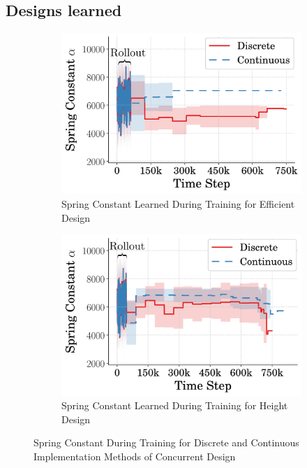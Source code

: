 \subsection{Designs learned}
%  
\begin{figure}[tb!]
  \centering
  \begin{subfigure}{.49\textwidth}
          \centering
          \includegraphics[width=\textwidth]{figures/Ch5/dis_vs_cont/avg_eff_spring_.png}  
          \caption{Spring Constant Learned During Training for Efficient Design}
          \label{fig:disc_vs_cont_spring_eff}
  \end{subfigure}%
  \hfill
  \begin{subfigure}{.49\textwidth}
          \centering
          \includegraphics[width=\textwidth]{figures/Ch5/dis_vs_cont/avg_hei_spring_.png}  
          \caption{Spring Constant Learned During Training for Height Design}
          \label{fig:disc_vs_cont_spring_high}
  \end{subfigure}
   \caption{Spring Constant During Training for Discrete and Continuous Implementation Methods of Concurrent Design}
   \label{fig:disc_vs_cont_spring}
\end{figure}
% 

